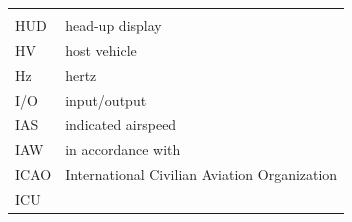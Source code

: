\documentclass[
]{book}
\begin{document}
\begin{longtable}[]{@{}ll@{}}
\begin{minipage}[t]{0.47\columnwidth}
\end{minipage}\tabularnewline
\begin{minipage}[t]{0.47\columnwidth}\raggedright
HUD\strut
\end{minipage} & \begin{minipage}[t]{0.47\columnwidth}\raggedright
head-up display\strut
\end{minipage}\tabularnewline
\begin{minipage}[t]{0.47\columnwidth}\raggedright
HV\strut
\end{minipage} & \begin{minipage}[t]{0.47\columnwidth}\raggedright
host vehicle\strut
\end{minipage}\tabularnewline
\begin{minipage}[t]{0.47\columnwidth}\raggedright
Hz\strut
\end{minipage} & \begin{minipage}[t]{0.47\columnwidth}\raggedright
hertz\strut
\end{minipage}\tabularnewline
\begin{minipage}[t]{0.47\columnwidth}\raggedright
I/O\strut
\end{minipage} & \begin{minipage}[t]{0.47\columnwidth}\raggedright
input/output\strut
\end{minipage}\tabularnewline
\begin{minipage}[t]{0.47\columnwidth}\raggedright
IAS\strut
\end{minipage} & \begin{minipage}[t]{0.47\columnwidth}\raggedright
indicated airspeed\strut
\end{minipage}\tabularnewline
\begin{minipage}[t]{0.47\columnwidth}\raggedright
IAW\strut
\end{minipage} & \begin{minipage}[t]{0.47\columnwidth}\raggedright
in accordance with\strut
\end{minipage}\tabularnewline
\begin{minipage}[t]{0.47\columnwidth}\raggedright
ICAO\strut
\end{minipage} & \begin{minipage}[t]{0.47\columnwidth}\raggedright
International Civilian Aviation Organization\strut
\end{minipage}\tabularnewline
\begin{minipage}[t]{0.47\columnwidth}\raggedright
ICU\strut
\end{minipage} & \begin{minipage}[t]{0.47\columnwidth}\raggedright

\end{minipage}
\end{longtable}
\end{document}
